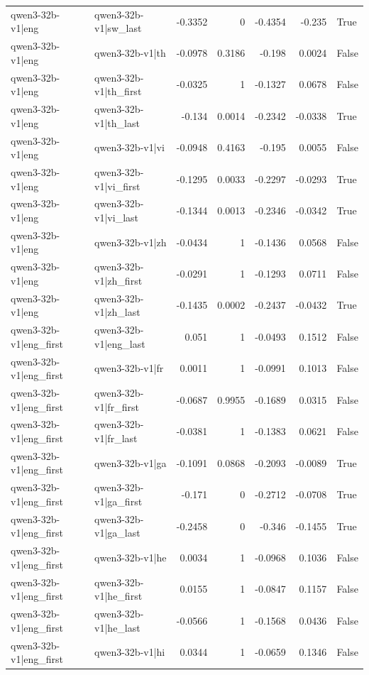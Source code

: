 \begin{table}
\begin{tabular}{l l r r r r l}
qwen3-32b-v1|eng & qwen3-32b-v1|sw_last & -0.3352 & 0 & -0.4354 & -0.235 & True \\
qwen3-32b-v1|eng & qwen3-32b-v1|th & -0.0978 & 0.3186 & -0.198 & 0.0024 & False \\
qwen3-32b-v1|eng & qwen3-32b-v1|th_first & -0.0325 & 1 & -0.1327 & 0.0678 & False \\
qwen3-32b-v1|eng & qwen3-32b-v1|th_last & -0.134 & 0.0014 & -0.2342 & -0.0338 & True \\
qwen3-32b-v1|eng & qwen3-32b-v1|vi & -0.0948 & 0.4163 & -0.195 & 0.0055 & False \\
qwen3-32b-v1|eng & qwen3-32b-v1|vi_first & -0.1295 & 0.0033 & -0.2297 & -0.0293 & True \\
qwen3-32b-v1|eng & qwen3-32b-v1|vi_last & -0.1344 & 0.0013 & -0.2346 & -0.0342 & True \\
qwen3-32b-v1|eng & qwen3-32b-v1|zh & -0.0434 & 1 & -0.1436 & 0.0568 & False \\
qwen3-32b-v1|eng & qwen3-32b-v1|zh_first & -0.0291 & 1 & -0.1293 & 0.0711 & False \\
qwen3-32b-v1|eng & qwen3-32b-v1|zh_last & -0.1435 & 0.0002 & -0.2437 & -0.0432 & True \\
qwen3-32b-v1|eng_first & qwen3-32b-v1|eng_last & 0.051 & 1 & -0.0493 & 0.1512 & False \\
qwen3-32b-v1|eng_first & qwen3-32b-v1|fr & 0.0011 & 1 & -0.0991 & 0.1013 & False \\
qwen3-32b-v1|eng_first & qwen3-32b-v1|fr_first & -0.0687 & 0.9955 & -0.1689 & 0.0315 & False \\
qwen3-32b-v1|eng_first & qwen3-32b-v1|fr_last & -0.0381 & 1 & -0.1383 & 0.0621 & False \\
qwen3-32b-v1|eng_first & qwen3-32b-v1|ga & -0.1091 & 0.0868 & -0.2093 & -0.0089 & True \\
qwen3-32b-v1|eng_first & qwen3-32b-v1|ga_first & -0.171 & 0 & -0.2712 & -0.0708 & True \\
qwen3-32b-v1|eng_first & qwen3-32b-v1|ga_last & -0.2458 & 0 & -0.346 & -0.1455 & True \\
qwen3-32b-v1|eng_first & qwen3-32b-v1|he & 0.0034 & 1 & -0.0968 & 0.1036 & False \\
qwen3-32b-v1|eng_first & qwen3-32b-v1|he_first & 0.0155 & 1 & -0.0847 & 0.1157 & False \\
qwen3-32b-v1|eng_first & qwen3-32b-v1|he_last & -0.0566 & 1 & -0.1568 & 0.0436 & False \\
qwen3-32b-v1|eng_first & qwen3-32b-v1|hi & 0.0344 & 1 & -0.0659 & 0.1346 & False \\

\end{tabular}
\end{table}

